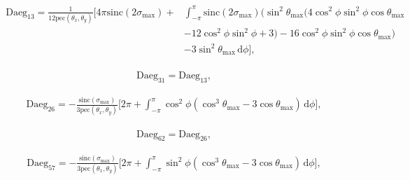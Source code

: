 \documentclass[a4paper,11pt,twoside,openright]{book}
\providecommand{\pec}{{\mathrm{pec}}}%
\providecommand{\sinc}{{\mathrm{sinc}}}%
\def\lthtmlcheckvsize{\ifdim\ht\sizebox<\vsize 
  \ifdim\wd\sizebox<\hsize\expandafter\hfill\fi \expandafter\vfill
  \else\expandafter\vss\fi}%
\begin{document}
{\newpage\clearpage
\setcounter{equation}{52}
%
\begin{subequations}\begin{flalign}
\begin{split}
\textrm{Daeg}_{13} = \frac{1}{12\pec (\theta_x , \theta_y )} \Bigg[
4\pi \sinc (2\sigma_{\textrm{max}}) + &
\int_{-\pi}^{\pi}
\sinc (2\sigma_{\textrm{max}}) \bigg( \sin^2\theta_{\textrm{max}}\Big( 4\cos^2\phi \sin^2\phi \cos\theta_{\textrm{max}}\\
& - 12\cos^2\phi \sin^2\phi + 3 \Big) - 16\cos^2\phi \sin^2\phi \cos\theta_{\textrm{max}}\bigg) \\
& - 3\sin^2\theta_{\textrm{max}}
\,\mathrm{d}\phi
\Bigg] ,
\end{split} &
\end{flalign}\end{subequations}%
\lthtmldisplayZ
\lthtmlcheckvsize\clearpage}

{\newpage\clearpage
\setcounter{equation}{52}
%
\begin{subequations}\begin{flalign}
&\textrm{Daeg}_{31} = \textrm{Daeg}_{13} , &
\end{flalign}\end{subequations}%
\lthtmldisplayZ
\lthtmlcheckvsize\clearpage}

{\newpage\clearpage
\setcounter{equation}{52}
%
\begin{subequations}\begin{flalign}
&\textrm{Daeg}_{26} = -\frac{\sinc (\sigma_{\textrm{max}})}{3\pec (\theta_x , \theta_y )} \Bigg[
2\pi +
\int_{-\pi}^{\pi}
\cos^2\phi \left( \cos^3\theta_{\textrm{max}}- 3\cos\theta_{\textrm{max}}\right)
\,\mathrm{d}\phi
\Bigg] , &
\end{flalign}\end{subequations}%
\lthtmldisplayZ
\lthtmlcheckvsize\clearpage}

{\newpage\clearpage
\setcounter{equation}{52}
%
\begin{subequations}\begin{flalign}
&\textrm{Daeg}_{62} = \textrm{Daeg}_{26} , &
\end{flalign}\end{subequations}%
\lthtmldisplayZ
\lthtmlcheckvsize\clearpage}

{\newpage\clearpage
\setcounter{equation}{52}
%
\begin{subequations}\begin{flalign}
&\textrm{Daeg}_{57} = -\frac{\sinc (\sigma_{\textrm{max}})}{3\pec (\theta_x , \theta_y )} \Bigg[
2\pi +
\int_{-\pi}^{\pi}
\sin^2\phi \left( \cos^3\theta_{\textrm{max}}- 3\cos\theta_{\textrm{max}}\right)
\,\mathrm{d}\phi
\Bigg] , &
\end{flalign}\end{subequations}%
\lthtmldisplayZ
\lthtmlcheckvsize\clearpage}
\end{document}
